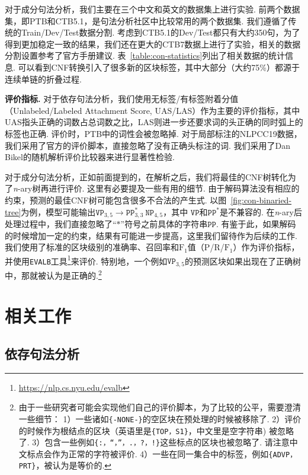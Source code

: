 对于成分句法分析，我们主要在三个中文和英文的数据集上进行实验.
前两个数据集，即PTB和CTB5.1，是句法分析社区中比较常用的两个数据集.
我们遵循了传统的Train/Dev/Test数据分割.
考虑到CTB5.1的Dev/Test都只有大约350句，为了得到更加稳定一致的结果，我们还在更大的CTB7数据上进行了实验，相关的数据分割设置参考了官方手册建议.
表~\ref{table:con-statistics}列出了相关数据的统计信息.
可以看到CNF转换引入了很多新的区块标签，其中大部分（大约75\%）都源于连续单链的折叠过程.



\noindent\textbf{评价指标.}
对于依存句法分析，我们使用无标签/有标签附着分值（Unlabeled/Labeled Attachment Score, UAS/LAS）作为主要的评价指标，其中UAS指头正确的词数占总词数之比，LAS则进一步还要求词的头正确的同时弧上的标签也正确.
评价时，PTB中的词性会被忽略掉.
对于局部标注的NLPCC19数据，我们采用了官方的评价脚本，直接忽略了没有正确头标注的词.
我们采用了Dan Bikel的随机解析评价比较器来进行显著性检验.

对于成分句法分析，正如前面提到的，在解析之后，我们将最佳的CNF树转化为了\textit{n}-ary树再进行评价.
这里有必要提及一些有用的细节.
由于解码算法没有相应的约束，预测的最佳CNF树可能包含很多不合法的产生式.
以图~\ref{fig:con-binaried-tree}为例，模型可能输出$\texttt{VP}_{3,5} \rightarrow \texttt{PP}^{\ast}_{3,3} ~ \texttt{NP}_{4,5}$，其中 $\texttt{VP}$和$\texttt{PP}^{\ast}$是不兼容的.
在\textit{n}-ary后处理过程中，我们直接忽略了``$\mathtt{\ast}$''符号之前具体的字符串$\texttt{PP}$.
有鉴于此，如果解码的时候增加一定的约束，结果有可能进一步提高，这里我们留待作为后续的工作.
我们使用了标准的区块级别的准确率、召回率和$\mathrm{F}_1$值（$\mathrm{P}$/$\mathrm{R}$/$\mathrm{F}_1$）作为评价指标，并使用\texttt{EVALB}工具\footnote{\url{https://nlp.cs.nyu.edu/evalb}}来评价.
特别地，一个例如$\texttt{VP}_{3,5}$的预测区块如果出现在了正确树中，那就被认为是正确的.\footnote{
  由于一些研究者可能会实现他们自己的评价脚本，为了比较的公平，需要澄清一些细节：
  1）一些诸如\texttt{\{-NONE-\}}的空区块在预处理的时候被移除了.
  2）评价的时候作为根结点的区块（英语里是\texttt{\{TOP，S1\}}，中文里是空字符串) 被忽略了.
  3）包含一些例如\texttt{\{:，``，''，.，?，!\}}这些标点的区块也被忽略了.
  请注意中文标点会作为正常的字符被评价.
  4）一些在同一集合中的标签，例如\texttt{\{ADVP，PRT\}}，被认为是等价的.}

\section{相关工作}
\label{sec:relworks}

\subsection{依存句法分析}

